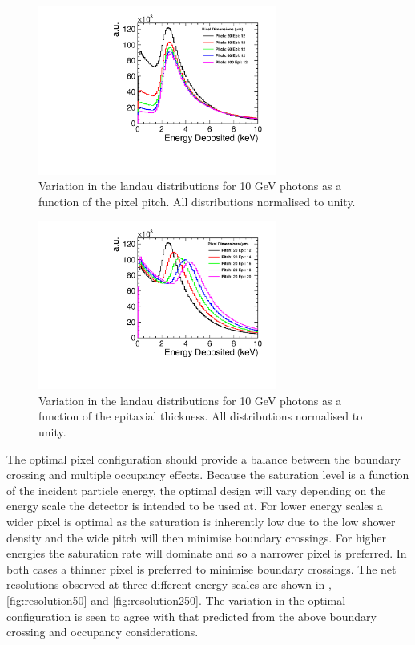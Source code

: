 \begin{figure}
  \centering
  \includegraphics[width=0.7\textwidth,keepaspectratio]{DECALStudies/fig/LandauVsPitch.pdf}
  \caption{Variation in the landau distributions for 10 GeV photons as a function of the pixel pitch. All distributions normalised to unity.}
  \label{fig:landaupitches}
\end{figure}
\begin{figure}
  \centering
  \includegraphics[width=0.7\textwidth,keepaspectratio]{DECALStudies/fig/LandauVsEpi.pdf}
  \caption{Variation in the landau distributions for 10 GeV photons as a function of the epitaxial thickness. All distributions normalised to unity.}
  \label{fig:landauthickness}
\end{figure}

The optimal pixel configuration should provide a balance between the boundary crossing and multiple occupancy effects. Because the saturation level is a function of the incident particle energy, the optimal design will vary depending on the energy scale the detector is intended to be used at. For lower energy scales a wider pixel is optimal as the saturation is inherently low due to the low shower density and the wide pitch will then minimise boundary crossings. For higher energies the saturation rate will dominate and so a narrower pixel is preferred. In both cases a thinner pixel is preferred to minimise boundary crossings. The net resolutions observed at three different energy scales are shown in , \ref{fig:resolution50} and \ref{fig:resolution250}. The variation in the optimal configuration is seen to agree with that predicted from the above boundary crossing and occupancy considerations.

